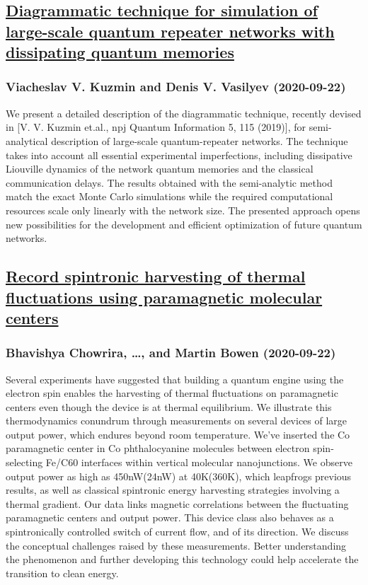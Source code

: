 {\subsection*{\href{http://arxiv.org/abs/2009.10415v1}{Diagrammatic technique for simulation of large-scale quantum repeater  networks with dissipating quantum memories}}
\subsubsection*{Viacheslav V. Kuzmin and Denis V. Vasilyev (2020-09-22)}
We present a detailed description of the diagrammatic technique, recently
devised in [V. V. Kuzmin et.al., npj Quantum Information 5, 115 (2019)], for
semi-analytical description of large-scale quantum-repeater networks. The
technique takes into account all essential experimental imperfections,
including dissipative Liouville dynamics of the network quantum memories and
the classical communication delays. The results obtained with the semi-analytic
method match the exact Monte Carlo simulations while the required computational
resources scale only linearly with the network size. The presented approach
opens new possibilities for the development and efficient optimization of
future quantum networks.

\subsection*{\href{http://arxiv.org/abs/2009.10413v1}{Record spintronic harvesting of thermal fluctuations using paramagnetic  molecular centers}}
\subsubsection*{Bhavishya Chowrira, \dots, and Martin Bowen (2020-09-22)}
Several experiments have suggested that building a quantum engine using the
electron spin enables the harvesting of thermal fluctuations on paramagnetic
centers even though the device is at thermal equilibrium. We illustrate this
thermodynamics conundrum through measurements on several devices of large
output power, which endures beyond room temperature. We've inserted the Co
paramagnetic center in Co phthalocyanine molecules between electron
spin-selecting Fe/C60 interfaces within vertical molecular nanojunctions. We
observe output power as high as 450nW(24nW) at 40K(360K), which leapfrogs
previous results, as well as classical spintronic energy harvesting strategies
involving a thermal gradient. Our data links magnetic correlations between the
fluctuating paramagnetic centers and output power. This device class also
behaves as a spintronically controlled switch of current flow, and of its
direction. We discuss the conceptual challenges raised by these measurements.
Better understanding the phenomenon and further developing this technology
could help accelerate the transition to clean energy.

}

